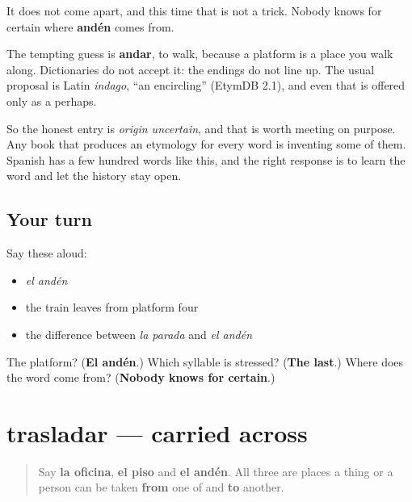 \begin{cousinweb}
It does not come apart, and this time that is not a trick. Nobody knows for certain where \textbf{andén} comes from.

The tempting guess is \textbf{andar}, to walk, because a platform is a place you walk along. Dictionaries do not accept it: the endings do not line up. The usual proposal is Latin \emph{indago}, \textquotedblleft{}an encircling\textquotedblright{} (EtymDB 2.1), and even that is offered only as a perhaps.

So the honest entry is \emph{origin uncertain}, and that is worth meeting on purpose. Any book that produces an etymology for every word is inventing some of them. Spanish has a few hundred words like this, and the right response is to learn the word and let the history stay open.
\end{cousinweb}

\subsection*{Your turn}
Say these aloud:

\begin{itemize}
\raggedright
  \item \emph{el andén}
  \item the train leaves from platform four
  \item the difference between \emph{la parada} and \emph{el andén}
\end{itemize}

\begin{tcolorbox}[breakable,colback=teal!4,colframe=teal!35!black,title={Before you move on}]
The platform? (\textbf{El andén}.) Which syllable is stressed? (\textbf{The last}.) Where does the word come from? (\textbf{Nobody knows for certain}.)
\end{tcolorbox}
\section[trasladar]{trasladar — carried across}

\label{lesson:ES-C439-trasladar}



\begin{quote}
Say \textbf{la oficina}, \textbf{el piso} and \textbf{el andén}. All three are places a thing or a person can be taken \textbf{from} one of and \textbf{to} another.
\end{quote}

